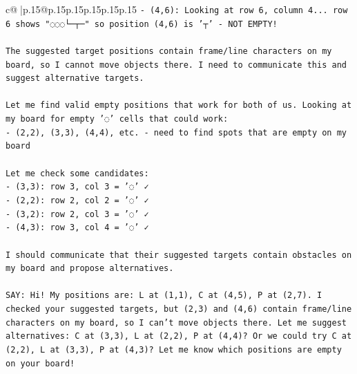 \documentclass{article}
\begin{document}
{\begin{supertabular}{c@{$\;$}|p{.15\linewidth}@{}p{.15\linewidth}p{.15\linewidth}p{.15\linewidth}p{.15\linewidth}p{.15\linewidth}}
{{{\texttt{{-} (4,6): Looking at row 6, column 4... row 6 shows "◌◌◌└─┬─" so position (4,6) is '┬' {-} NOT EMPTY!} \\
\\ 
\texttt{The suggested target positions contain frame/line characters on my board, so I cannot move objects there. I need to communicate this and suggest alternative targets.} \\
\\ 
\texttt{Let me find valid empty positions that work for both of us. Looking at my board for empty '◌' cells that could work:} \\
\texttt{{-} (2,2), (3,3), (4,4), etc. {-} need to find spots that are empty on my board} \\
\\ 
\texttt{Let me check some candidates:} \\
\texttt{{-} (3,3): row 3, col 3 = '◌' ✓} \\
\texttt{{-} (2,2): row 2, col 2 = '◌' ✓} \\
\texttt{{-} (3,2): row 2, col 3 = '◌' ✓} \\
\texttt{{-} (4,3): row 3, col 4 = '◌' ✓} \\
\\ 
\texttt{I should communicate that their suggested targets contain obstacles on my board and propose alternatives.} \\
\\ 
\texttt{SAY: Hi! My positions are: L at (1,1), C at (4,5), P at (2,7). I checked your suggested targets, but (2,3) and (4,6) contain frame/line characters on my board, so I can't move objects there. Let me suggest alternatives: C at (3,3), L at (2,2), P at (4,4)? Or we could try C at (2,2), L at (3,3), P at (4,3)? Let me know which positions are empty on your board!} \\
            }
        }
    }
     \\ \\


\end{supertabular}}
\end{document}
